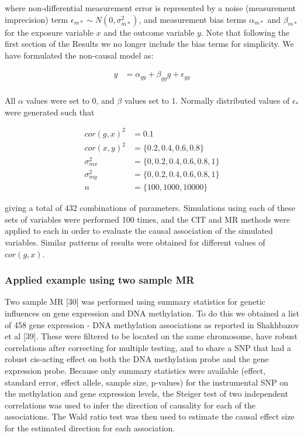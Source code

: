 \documentclass[]{article}
\begin{document}
where non-differential measurement error is represented by a noise
(measurement imprecision) term
\(\epsilon_{m*} \sim N(0, \sigma^2_{m*})\), and measurement bias terms
\(\alpha_{m*}\) and \(\beta_{m*}\) for the exposure variable \(x\) and
the outcome variable \(y\). Note that following the first section of the
Results we no longer include the bias terms for simplicity. We have
formulated the non-causal model as:

\[
\begin{aligned}
y & = \alpha_{gy} + \beta_{gy} g + \epsilon_{gy} \\
\end{aligned}
\]

All \(\alpha\) values were set to 0, and \(\beta\) values set to 1.
Normally distributed values of \(\epsilon_*\) were generated such that

\[
\begin{aligned}
cor(g, x)^2 & = 0.1 \\
cor(x, y)^2 & = \{0.2, 0.4, 0.6, 0.8\} \\
\sigma^2_{mx} & = \{0, 0.2, 0.4, 0.6, 0.8, 1\} \\
\sigma^2_{my} & = \{0, 0.2, 0.4, 0.6, 0.8, 1\} \\
n & = \{100, 1000, 10000\}
\end{aligned}
\]

giving a total of 432 combinations of parameters. Simulations using each
of these sets of variables were performed 100 times, and the CIT and MR
methods were applied to each in order to evaluate the causal association
of the simulated variables. Similar patterns of results were obtained
for different values of \(cor(g, x)\).

\hypertarget{applied-example-using-two-sample-mr}{%
\subsubsection{Applied example using two sample
MR}\label{applied-example-using-two-sample-mr}}

Two sample MR {[}30{]} was performed using summary statistics for
genetic influences on gene expression and DNA methylation. To do this we
obtained a list of 458 gene expression - DNA methylation associations as
reported in Shakhbazov et al {[}39{]}. These were filtered to be located
on the same chromosome, have robust correlations after correcting for
multiple testing, and to share a SNP that had a robust cis-acting effect
on both the DNA methylation probe and the gene expression probe. Because
only summary statistics were available (effect, standard error, effect
allele, sample size, p-values) for the instrumental SNP on the
methylation and gene expression levels, the Steiger test of two
independent correlations was used to infer the direction of causality
for each of the associations. The Wald ratio test was then used to
estimate the causal effect size for the estimated direction for each
association.
\end{document}
